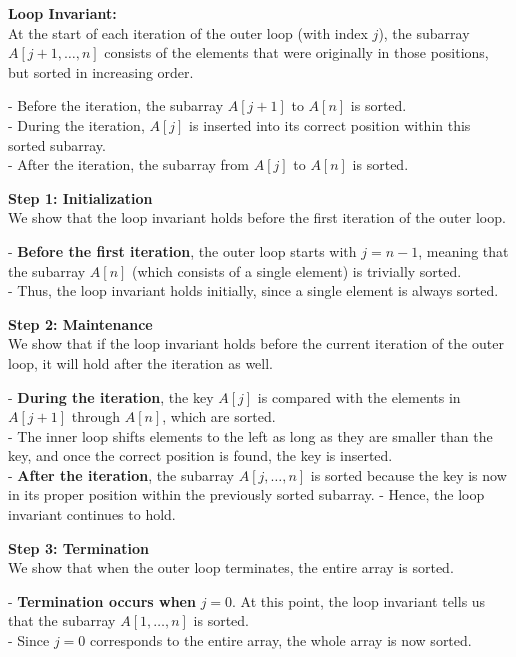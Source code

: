 \documentclass[12pt]{article}
\newcommand{\vs}{\vspace{2mm}}
\begin{document}
\textbf{Loop Invariant:} \\
At the start of each iteration of the outer loop (with index $j$), the subarray $A[j+1, \ldots, n]$ consists of the elements that were originally in those positions, but sorted in increasing order.

\vs
- Before the iteration, the subarray $A[j+1]$ to $A[n]$ is sorted. \\
- During the iteration, $A[j]$ is inserted into its correct position within this sorted subarray. \\
- After the iteration, the subarray from $A[j]$ to $A[n]$ is sorted.

\vs
\textbf{Step 1: Initialization} \\
We show that the loop invariant holds before the first iteration of the outer loop.

- \textbf{Before the first iteration}, the outer loop starts with $j = n-1$, meaning that the subarray $A[n]$ (which consists of a single element) is trivially sorted. \\
- Thus, the loop invariant holds initially, since a single element is always sorted.

\vs
\textbf{Step 2: Maintenance} \\
We show that if the loop invariant holds before the current iteration of the outer loop, it will hold after the iteration as well.

- \textbf{During the iteration}, the key $A[j]$ is compared with the elements in $A[j+1]$ through $A[n]$, which are sorted. \\
- The inner loop shifts elements to the left as long as they are smaller than the key, and once the correct position is found, the key is inserted. \\
- \textbf{After the iteration}, the subarray $A[j, \ldots, n]$ is sorted because the key is now in its proper position within the previously sorted subarray.
- Hence, the loop invariant continues to hold.

\vs
\textbf{Step 3: Termination} \\
We show that when the outer loop terminates, the entire array is sorted.

- \textbf{Termination occurs when} $j = 0$. At this point, the loop invariant tells us that the subarray $A[1, \ldots, n]$ is sorted. \\
- Since $j = 0$ corresponds to the entire array, the whole array is now sorted.

\vs\
\pagebreak
\end{document}
